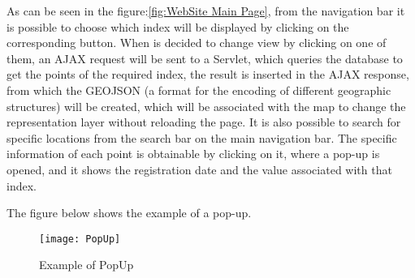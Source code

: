 \documentclass[tesi]{subfiles}
\begin{document}
As can be seen in the figure:\ref{fig:WebSite Main Page}, from the navigation bar it is possible to choose which index will be displayed by clicking on the corresponding button. When is decided to change view by clicking on one of them, an AJAX request will be sent to a Servlet, which queries the database to get the points of the required index, the result is inserted in the AJAX response, from which the GEOJSON (a format for the encoding of different geographic structures) will be created, which will be associated with the map to change the representation layer without reloading the page.
It is also possible to search for specific locations from the search bar on the main navigation bar.
The specific information of each point is obtainable by clicking on it, where a pop-up is opened, and it shows the registration date and the value associated with that index.

The figure below shows the example of a pop-up.


\begin{figure}[H]
\centering
\texttt{[image: PopUp]}
\caption{Example of PopUp}
\end{figure}\label{fig:PopUp}
\end{document}

